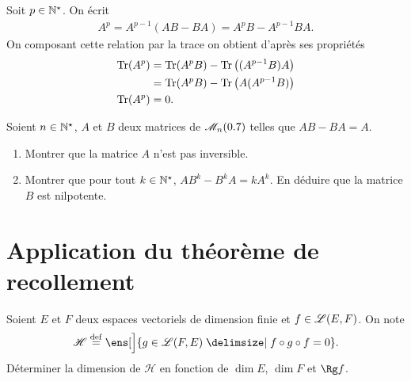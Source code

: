 
\begin{solution}
    Soit $p \in \mathbb{N}^\star$. On écrit
    \begin{align*}
        A^p = A^{p-1}(AB-BA) = A^pB - A^{p-1}BA.
    \end{align*}
    On composant cette relation par la trace on obtient d'après ses propriétés
    \begin{align*}
        \Tr(A^p) &= \Tr(A^pB) - \Tr \big((A^{p-1}B)A \big) \\
        &= \Tr(A^pB) - \Tr \big(A(A^{p-1}B) \big) \\
        \Tr(A^p) &= 0.
    \end{align*}
\end{solution}

\begin{exercice} 
    Soient $n \in \mathbb{N}^\star$, $A$ et $B$ deux matrices de $\mathscr{M}_n(0.7)$ telles que $AB - BA = A.$
    \begin{enumerate}
        \item Montrer que la matrice $A$ n'est pas inversible.
        \item Montrer que pour tout $k \in \mathbb{N}^\star$, $AB^k - B^k A = k A^k$. En déduire que la matrice $B$ est nilpotente. 
    \end{enumerate}
\end{exercice}

\section{Application du théorème de recollement}

\begin{exercice}
    Soient $E$ et $F$ deux espaces vectoriels de dimension finie et $f \in \mathscr{L}(E, F)$. On note 
    $$\mathscr{H} \defeq \ens[\Big]{ g \in \Endo(F, E) \tq f \circ g \circ f = 0}.$$ 
    Déterminer la dimension de $\mathscr{H}$ en fonction de $\dim E$, $\dim F$ et $\Rg f$.
\end{exercice}

